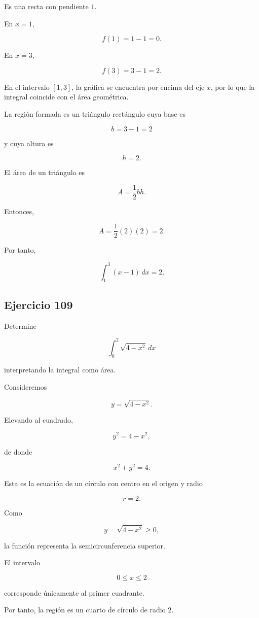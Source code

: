 \documentclass[12pt]{article}
\begin{document}
Es una recta con pendiente \(1\).

En \(x=1\),

\[
f(1)=1-1=0.
\]

En \(x=3\),

\[
f(3)=3-1=2.
\]

En el intervalo \([1,3]\), la gráfica se encuentra por encima del eje
\(x\), por lo que la integral coincide con el área geométrica.

La región formada es un triángulo rectángulo cuya base es

\[
b=3-1=2
\]

y cuya altura es

\[
h=2.
\]

El área de un triángulo es

\[
A=\frac12 bh.
\]

Entonces,

\[
A
=
\frac12(2)(2)
=
2.
\]

Por tanto,

\[
\boxed{
\int_{1}^{3}(x-1)\,dx=2
}.
\]

\subsection*{Ejercicio 109}

Determine

\[
\int_{0}^{2}\sqrt{4-x^2}\,dx
\]

interpretando la integral como área.

Consideremos

\[
y=\sqrt{4-x^2}.
\]

Elevando al cuadrado,

\[
y^2=4-x^2,
\]

de donde

\[
x^2+y^2=4.
\]

Esta es la ecuación de un círculo con centro en el origen y radio

\[
r=2.
\]

Como

\[
y=\sqrt{4-x^2}\geq 0,
\]

la función representa la semicircunferencia superior.

El intervalo

\[
0\leq x\leq 2
\]

corresponde únicamente al primer cuadrante.

Por tanto, la región es un cuarto de círculo de radio \(2\).
\end{document}
